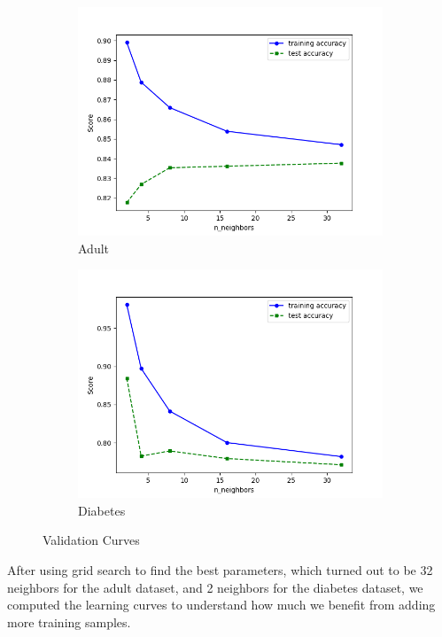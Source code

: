 \documentclass[11pt, twocolumn]{article}
\begin{document}
    \begin{figure}[!htbp]
        \begin{subfigure}{.24\textwidth}
            \centering
            \includegraphics[width=.9\textwidth]{validations_Adult_KNN_n_neighbors}
            \caption{Adult}
            \label{fig:validations_Adult_KNN}
        \end{subfigure}
        \begin{subfigure}{.24\textwidth}
            \centering
            \includegraphics[width=.9\textwidth]{validations_Diabetes_KNN_n_neighbors}
            \caption{Diabetes}
            \label{fig:validations_Diabetes_KNN}
        \end{subfigure}
        \caption{Validation Curves}
    \end{figure}
    \FloatBarrier

    After using grid search to find the best parameters, which turned out to be 32 neighbors for the adult dataset, and 2 neighbors for the diabetes dataset, we computed the learning curves to understand how much we benefit from adding more training samples.
\end{document}

